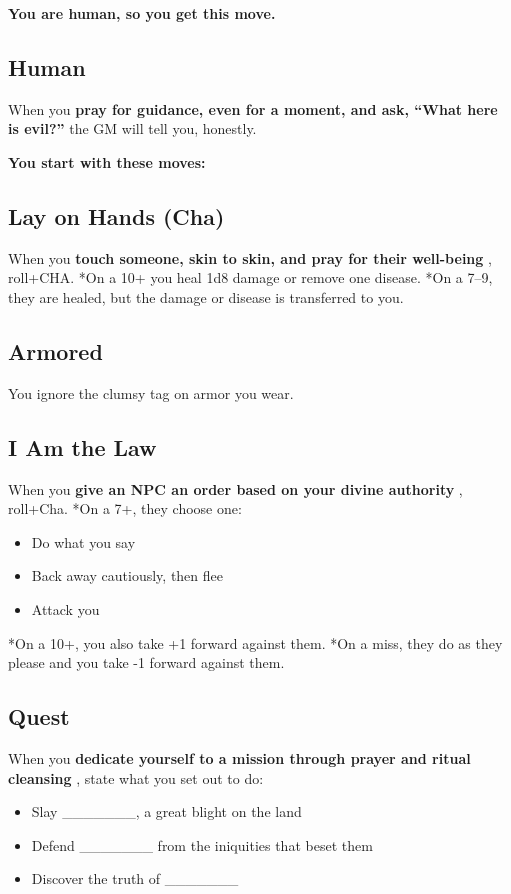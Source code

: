 {\bfseries You are human, so you get this move.}
\subsection{Human}

When you \textbf{pray for guidance, even for a moment, and ask, ``What here is evil?''}
the GM will tell you, honestly.

\vspace{\baselineskip}
{\bfseries You start with these moves:}
\subsection{Lay on Hands (Cha)}

When you \textbf{touch someone, skin to skin, and pray for their well-being }
, roll+CHA. *On a 10+ you heal 1d8 damage or remove one disease. *On a 7--9, they are healed, but the damage or disease is transferred to you.
\subsection{Armored}

You ignore the clumsy tag on armor you wear.
\subsection{I Am the Law}

When you \textbf{give an NPC an order based on your divine authority}
, roll+Cha. *On a 7+, they choose one:
\begin{itemize}
\item Do what you say
\item Back away cautiously, then flee
\item Attack you

\end{itemize}

*On a 10+, you also take +1 forward against them. *On a miss, they do as they please and you take -1 forward against them.
\subsection{Quest}

When you \textbf{dedicate yourself to a mission through prayer and ritual cleansing}
, state what you set out to do:
\begin{itemize}
\item Slay \_\_\_\_\_\_\_, a great blight on the land
\item Defend \_\_\_\_\_\_\_ from the iniquities that beset them
\item Discover the truth of \_\_\_\_\_\_\_

\end{itemize}

